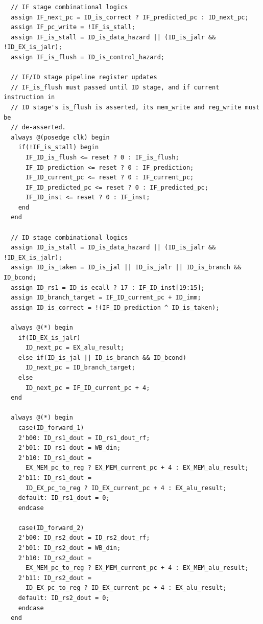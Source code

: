 \documentclass[openright, a4paper]{article}
\newenvironment{longlisting}{\captionsetup{type=listing}}{}
\begin{document}
\begin{longlisting}
    \begin{verbatim}
  // IF stage combinational logics
  assign IF_next_pc = ID_is_correct ? IF_predicted_pc : ID_next_pc;
  assign IF_pc_write = !IF_is_stall;
  assign IF_is_stall = ID_is_data_hazard || (ID_is_jalr && !ID_EX_is_jalr);
  assign IF_is_flush = ID_is_control_hazard;

  // IF/ID stage pipeline register updates
  // IF_is_flush must passed until ID stage, and if current instruction in 
  // ID stage's is_flush is asserted, its mem_write and reg_write must be 
  // de-asserted.
  always @(posedge clk) begin
    if(!IF_is_stall) begin
      IF_ID_is_flush <= reset ? 0 : IF_is_flush;
      IF_ID_prediction <= reset ? 0 : IF_prediction;
      IF_ID_current_pc <= reset ? 0 : IF_current_pc;
      IF_ID_predicted_pc <= reset ? 0 : IF_predicted_pc;
      IF_ID_inst <= reset ? 0 : IF_inst;
    end
  end
  
  // ID stage combinational logics
  assign ID_is_stall = ID_is_data_hazard || (ID_is_jalr && !ID_EX_is_jalr);
  assign ID_is_taken = ID_is_jal || ID_is_jalr || ID_is_branch && ID_bcond; 
  assign ID_rs1 = ID_is_ecall ? 17 : IF_ID_inst[19:15];
  assign ID_branch_target = IF_ID_current_pc + ID_imm; 
  assign ID_is_correct = !(IF_ID_prediction ^ ID_is_taken);

  always @(*) begin
    if(ID_EX_is_jalr)
      ID_next_pc = EX_alu_result;
    else if(ID_is_jal || ID_is_branch && ID_bcond)
      ID_next_pc = ID_branch_target;
    else
      ID_next_pc = IF_ID_current_pc + 4;
  end

  always @(*) begin
    case(ID_forward_1)
    2'b00: ID_rs1_dout = ID_rs1_dout_rf;
    2'b01: ID_rs1_dout = WB_din;
    2'b10: ID_rs1_dout =
      EX_MEM_pc_to_reg ? EX_MEM_current_pc + 4 : EX_MEM_alu_result;
    2'b11: ID_rs1_dout = 
      ID_EX_pc_to_reg ? ID_EX_current_pc + 4 : EX_alu_result;
    default: ID_rs1_dout = 0;
    endcase

    case(ID_forward_2)
    2'b00: ID_rs2_dout = ID_rs2_dout_rf;
    2'b01: ID_rs2_dout = WB_din;
    2'b10: ID_rs2_dout = 
      EX_MEM_pc_to_reg ? EX_MEM_current_pc + 4 : EX_MEM_alu_result;
    2'b11: ID_rs2_dout = 
      ID_EX_pc_to_reg ? ID_EX_current_pc + 4 : EX_alu_result;
    default: ID_rs2_dout = 0;
    endcase
  end


\end{verbatim}
\end{longlisting}
\end{document}
